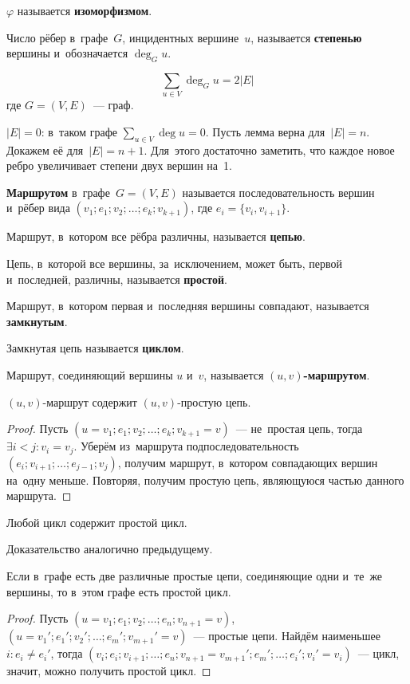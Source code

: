 $\varphi$ называется \textbf{изоморфизмом}.

Число рёбер в~графе~$G$, инцидентных вершине~$u$, называется \textbf{степенью} вершины и~обозначается $\deg_G u$.

\begin{lemma}[о рукопожатиях]
\[ \sum_{u \in V} \deg_G u = 2|E| \]
где $G = (V, E)$~--- граф.
\end{lemma}
\begin{proofmathind}
	\indbase $|E| = 0$: в~таком графе $\displaystyle \sum_{u \in V} \deg u = 0$.
	\newpage
	\indstep Пусть лемма верна для~$|E| = n$.
	Докажем её для~$|E| = n + 1$.
	Для~этого достаточно заметить, что каждое новое ребро увеличивает степени двух вершин на~1. \indend

\end{proofmathind}

\textbf{Маршрутом} в~графе~$G = (V, E)$ называется последовательность вершин и~рёбер вида $(v_1; e_1; v_2; \ldots; e_k; v_{k+1})$, где $e_i = \{ v_i, v_{i+1} \}$.

Маршрут, в~котором все рёбра различны, называется \textbf{цепью}.

Цепь, в~которой все вершины, за~исключением, может быть, первой и~последней, различны, называется \textbf{простой}.

Маршрут, в~котором первая и~последняя вершины совпадают, называется \textbf{замкнутым}.

Замкнутая цепь называется \textbf{циклом}.

Маршрут, соединяющий вершины $u$ и~$v$, называется \textbf{$(u, v)$\nobreakdash-\hspace{0pt}маршрутом}.

\begin{lemma}
$(u, v)$\nobreakdash-\hspace{0pt}маршрут содержит $(u, v)$\nobreakdash-\hspace{0pt}простую цепь.
\end{lemma}
\begin{proof}
Пусть $(u = v_1; e_1; v_2; \ldots; e_k; v_{k+1} = v)$~--- не~простая цепь, тогда $\exists i < j \colon v_i = v_j$.
Уберём из~маршрута подпоследовательность $(e_i; v_{i+1}; \ldots; e_{j-1}; v_j)$, получим маршрут, в~котором совпадающих вершин на~одну меньше.
Повторяя, получим простую цепь, являющуюся частью данного маршрута.
\end{proof}

\begin{lemma}
Любой цикл содержит простой цикл.
\end{lemma}%
Доказательство аналогично предыдущему.
	
\begin{lemma}
Если в~графе есть две различные простые цепи, соединяющие одни и~те~же вершины, то в~этом графе есть простой цикл.
\end{lemma}
\begin{proof}
Пусть $(u = v_1; e_1; v_2; \ldots; e_n; v_{n+1} = v)$, $(u = v_1'; e_1'; v_2'; \ldots; e_m'; v_{m+1}' = v)$~--- простые цепи.
Найдём наименьшее~$i \colon e_i \neq e_i'$, тогда $(v_i; e_i; v_{i+1}; \ldots; e_n; v_{n+1} = v_{m+1}'; e_m'; \ldots; e_i'; v_i' = v_i)$~--- цикл, значит, можно получить простой цикл.
\end{proof}
